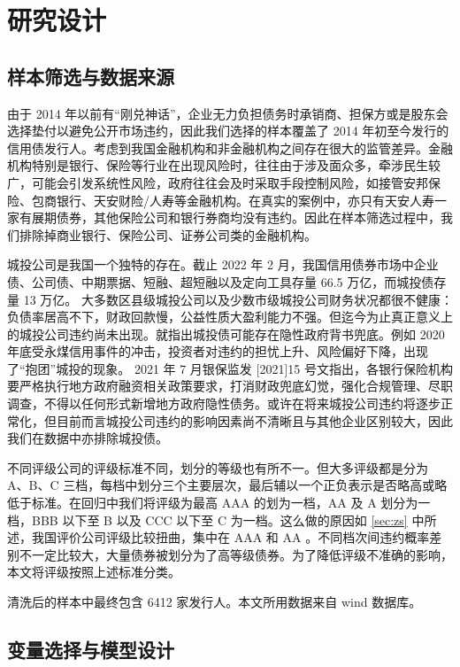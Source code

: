 
\chapter{研究设计}
\section{样本筛选与数据来源}
由于 2014 年以前有“刚兑神话”，企业无力负担债务时承销商、担保方或是股东会选择垫付以避免公开市场违约，因此我们选择的样本覆盖了 2014 年初至今发行的信用债发行人。考虑到我国金融机构和非金融机构之间存在很大的监管差异。金融机构特别是银行、保险等行业在出现风险时，往往由于涉及面众多，牵涉民生较广，可能会引发系统性风险，政府往往会及时采取手段控制风险，如接管安邦保险、包商银行、天安财险/人寿等金融机构。在真实的案例中，亦只有天安人寿一家有展期债券，其他保险公司和银行券商均没有违约。因此在样本筛选过程中，我们排除掉商业银行、保险公司、证券公司类的金融机构。

城投公司是我国一个独特的存在。截止 2022 年 2 月，我国信用债券市场中企业债、公司债、中期票据、短融、超短融以及定向工具存量 66.5 万亿，而城投债存量 13 万亿。
大多数区县级城投公司以及少数市级城投公司财务状况都很不健康：负债率居高不下，财政回款慢，公益性质大盈利能力不强。但迄今为止真正意义上的城投公司违约尚未出现。\Textcite{钟辉勇2016城投债的担保可信吗}就指出城投债可能存在隐性政府背书兜底。例如 2020 年底受永煤信用事件的冲击，投资者对违约的担忧上升、风险偏好下降，出现了“抱团”城投的现象。
2021 年 7 月银保监发 [2021]15 号文指出，各银行保险机构要严格执行地方政府融资相关政策要求，打消财政兜底幻觉，强化合规管理、尽职调查，不得以任何形式新增地方政府隐性债务。或许在将来城投公司违约将逐步正常化，但目前而言城投公司违约的影响因素尚不清晰且与其他企业区别较大，因此我们在数据中亦排除城投债。

不同评级公司的评级标准不同，划分的等级也有所不一。但大多评级都是分为 A、B、C 三档，每档中划分三个主要层次，最后辅以一个正负表示是否略高或略低于标准。在回归中我们将评级为最高 AAA 的划为一档，AA 及 A 划分为一档，BBB 以下至 B 以及 CCC 以下至 C 为一档。这么做的原因如 \ref{sec:zs} 中所述，我国评价公司评级比较扭曲，集中在 AAA 和 AA 。不同档次间违约概率差别不一定比较大，大量债券被划分为了高等级债券。为了降低评级不准确的影响，本文将评级按照上述标准分类。

清洗后的样本中最终包含 6412 家发行人。本文所用数据来自 wind 数据库。

\section{变量选择与模型设计}

